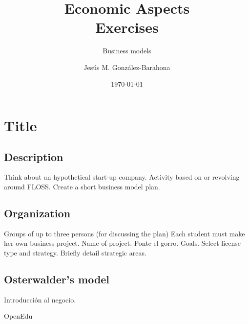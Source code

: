 \documentclass[11pt]{scrartcl}
\title{\textbf{Economic Aspects\\
                Exercises}}
\subtitle{Business models}
\author{Jesús M. González-Barahona}
\date{\today}
\begin{document}
\maketitle

\section{Title}

\subsection{Description}

Think about an hypothetical start-up company.
Activity based on or revolving around FLOSS.
Create a short business model plan.

\subsection{Organization}

Groups of up to three persons (for discussing the plan)
Each student must make her own business project.
Name of project. Ponte el gorro.
Goals.
Select license type and strategy.
Briefly detail strategic areas.

\subsection{Osterwalder's model}

Introducción al negocio.

OpenEdu
\end{document}

